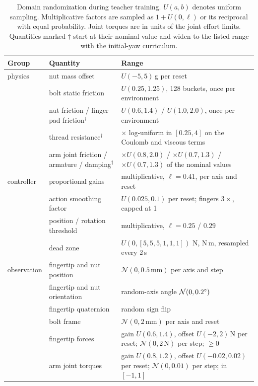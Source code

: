 \begin{table}[!htbp]%
    \centering%
    \caption{Domain randomization during teacher training. $U(a,b)$ denotes uniform sampling. Multiplicative factors are sampled as $1+U(0,\ell)$ or its reciprocal with equal probability. Joint torques are in units of the joint effort limits. Quantities marked $\dagger$ start at their nominal value and widen to the listed range with the initial-yaw curriculum.}%
    \label{tab:dr}%
    \small
    \begin{tabularx}{\textwidth}{lYY}
        \toprule
        Group & Quantity & Range \\
        \midrule
        physics & nut mass offset & $U(-5,5)$\,g per reset \\
         & bolt static friction & $U(0.25,1.25)$, 128 buckets, once per environment \\
         & nut friction / finger pad friction$^{\dagger}$ & $U(0.6,1.4)$ / $U(1.0,2.0)$, once per environment \\
         & thread resistance$^{\dagger}$ & $\times$ log-uniform in $[0.25,4]$ on the Coulomb and viscous terms \\
         & arm joint friction / armature / damping$^{\dagger}$ & $\times U(0.8,2.0)$ / $\times U(0.7,1.3)$ / $\times U(0.7,1.3)$ of the nominal values \\
        controller & proportional gains & multiplicative, $\ell=0.41$, per axis and reset \\
         & action smoothing factor & $U(0.025,0.1)$ per reset; fingers $3\times$, capped at 1 \\
         & position / rotation threshold & multiplicative, $\ell=0.25$ / $0.29$ \\
         & dead zone & $U(0,[5,5,5,1,1,1])$ N, N\,m, resampled every 2\,s \\
        observation & fingertip and nut position & $\mathcal{N}(0,0.5\,\mathrm{mm})$ per axis and step \\
         & fingertip and nut orientation & random-axis angle $\mathcal{N}(0,0.2^\circ)$ \\
         & fingertip quaternion & random sign flip \\
         & bolt frame & $\mathcal{N}(0,2\,\mathrm{mm})$ per axis and reset \\
         & fingertip forces & gain $U(0.6,1.4)$, offset $U(-2,2)$\,N per reset; $\mathcal{N}(0,2\,\mathrm{N})$ per step; $\ge0$ \\
         & arm joint torques & gain $U(0.8,1.2)$, offset $U(-0.02,0.02)$ per reset; $\mathcal{N}(0,0.01)$ per step; in $[-1,1]$ \\

\end{tabularx}
\end{table}
